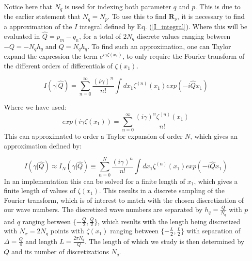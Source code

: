 \documentclass[../main.tex]{subfiles}
\begin{document}
Notice here that $N_q$ is used for indexing both parameter $q$ and $p$. This is due to the earlier statement that $N_q = N_p$. To use this to find $\boldsymbol{R}_{\nu}$, it is necessary to find a approximation of the $I$ integral defined by Eq. (\ref{I_integral}). Where this will be evaluated in $\hat{Q} =p_m - q_n $, for a total of $2 N_q$ discrete values ranging between $-Q = -N_q h_q$ and $Q = N_q h_q$.
To find such an approximation, one can Taylor expand the expression the term $e^{i\gamma\zeta(x_1)}$, to only require the Fourier transform of the different orders of differentials of $\zeta(x_1)$.

\begin{equation}
    I(\gamma |\hat{Q}) = \sum^{\infty}_{n=0} \frac{(i\gamma)^n}{n!} \int dx_1 \zeta^{(n)}(x_1) exp(-i\hat{Q}x_1)
\end{equation}

Where we have used: 
\begin{equation}
    exp(i\gamma\zeta(x_1)) = \sum^{\infty}_{n=0}\frac{(i\gamma)^n \zeta^{(n)}(x_1)}{n!}
\end{equation}
This can approximated to order a Taylor expansion of order $N$, which gives an approximation defined by:

\begin{equation}
    I(\gamma|\hat{Q}) \approx I_N(\gamma|\hat{Q}) \equiv \sum^N_{n=0} \frac{(i\gamma)^n}{n!} \int dx_1 \zeta^{(n)}(x_1) exp(-i\hat{Q}x_1)
\end{equation}
In an implementation this can be solved for a finite length of $x_1$, which gives a finite length of values of $\zeta(x_1)$. This results in a discrete sampling of the Fourier transform, which is of interest to match with the chosen discretization of our wave numbers. The discretized wave numbers are separated by $h_q = \frac{Q}{N_q}$ with $p$ and $q$ ranging between $\{-\frac{Q}{2}, \frac{Q}{2} \}$, which results with the length being discretized with $N_x = 2 N_q $ points with $\zeta(x_1)$ ranging between $\{-\frac{L}{2}, \frac{L}{2} \}$ with separation of $\Delta = \frac{Q}{\pi}$ and length $L = \frac{2\pi N_q}{Q}$. The length of which we study is then determined by $Q$ and its number of discretizations $N_q$.
\end{document}
